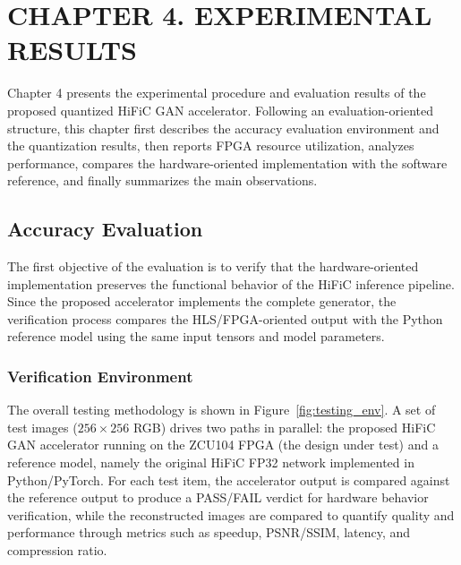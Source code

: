 \newpage
\section*{CHAPTER 4. EXPERIMENTAL RESULTS}
\setcounter{section}{4}
\setcounter{subsection}{0}
\setcounter{subsubsection}{0}
\setcounter{paragraph}{0}
\setcounter{figure}{0}
\setcounter{table}{0}

Chapter 4 presents the experimental procedure and evaluation results of the proposed quantized HiFiC GAN accelerator. Following an evaluation-oriented structure, this chapter first describes the accuracy evaluation environment and the quantization results, then reports FPGA resource utilization, analyzes performance, compares the hardware-oriented implementation with the software reference, and finally summarizes the main observations.

\subsection{Accuracy Evaluation}

The first objective of the evaluation is to verify that the hardware-oriented implementation preserves the functional behavior of the HiFiC inference pipeline. Since the proposed accelerator implements the complete generator, the verification process compares the HLS/FPGA-oriented output with the Python reference model using the same input tensors and model parameters.

\subsubsection{Verification Environment}

The overall testing methodology is shown in Figure~\ref{fig:testing_env}. A set of test images ($256 \times 256$ RGB) drives two paths in parallel: the proposed HiFiC GAN accelerator running on the ZCU104 FPGA (the design under test) and a reference model, namely the original HiFiC FP32 network implemented in Python/PyTorch. For each test item, the accelerator output is compared against the reference output to produce a PASS/FAIL verdict for hardware behavior verification, while the reconstructed images are compared to quantify quality and performance through metrics such as speedup, PSNR/SSIM, latency, and compression ratio.

